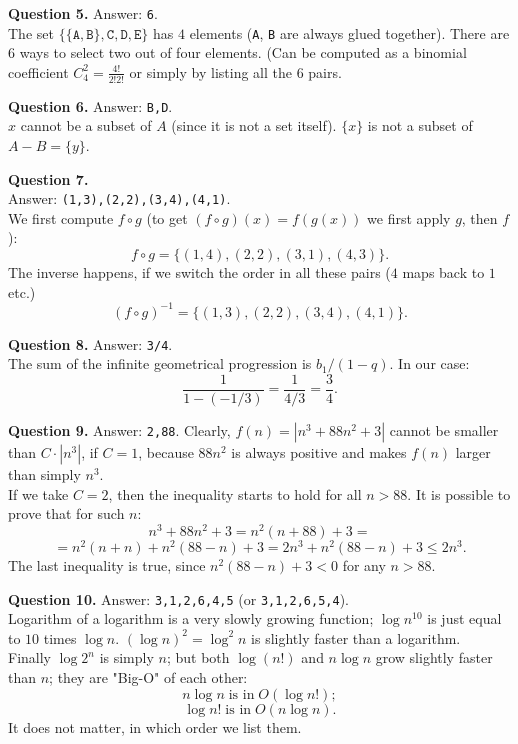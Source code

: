 \documentclass[jou]{apa6}
\begin{document}
\vspace{6pt}
{\bf Question 5.} Answer: {\tt 6}.\\
The set $\{ \{ \mathtt{A}, \mathtt{B} \}, \mathtt{C}, \mathtt{D}, \mathtt{E} \}$
has $4$ elements ({\tt A}, {\tt B} are always glued together). 
There are $6$ ways to select two out of four elements. 
(Can be computed as a binomial coefficient $C_4^2 = \frac{4!}{2!2!}$ or simply 
by listing all the $6$ pairs. 


\vspace{6pt}
{\bf Question 6.} Answer: {\tt B,D}.\\
$x$ cannot be a subset of $A$ (since it is not a set itself). 
$\{ x \}$ is not a subset of $A - B = \{ y \}$.

\vspace{6pt}
{\bf Question 7.}\\ Answer: {\tt (1,3),(2,2),(3,4),(4,1)}.\\
We first compute $f \circ g$ (to get $(f \circ g)(x) = f(g(x))$
we first apply $g$, then $f$): 
$$f \circ g = \{(1,4),(2,2),(3,1),(4,3)\}.$$
The inverse happens, if we switch the order in all these pairs
($4$ maps back to $1$ etc.)\\
$$(f \circ g)^{-1} = \{(1,3),(2,2),(3,4),(4,1)\}.$$


\vspace{6pt}
{\bf Question 8.} Answer: {\tt 3/4}.\\
The sum of the infinite geometrical progression is $b_1/(1 - q)$. 
In our case:
$$\frac{1}{1 - (-1/3)} = \frac{1}{4/3} = \frac{3}{4}.$$

\vspace{6pt}
{\bf Question 9.} Answer: {\tt 2,88}. 
Clearly, $f(n) = |n^3 +88n^2 +3|$ cannot be smaller than $C\cdot{}|n^3|$, 
if $C=1$, because $88n^2$ is always positive and makes $f(n)$ larger
than simply $n^3$.\\
If we take $C = 2$, then the inequality starts to hold for all $n>88$. 
It is possible to prove that for such $n$: 
$$n^3 +88n^2 +3 = n^2(n + 88) + 3 =$$
$$ = n^2(n+n) + n^2(88 -n) + 3  = 2n^3 + n^2(88-n) + 3 \leq 2n^3.$$
The last inequality is true, since $n^2(88-n) + 3 < 0$ for any 
$n > 88$.


\vspace{6pt}
{\bf Question 10.} Answer: {\tt 3,1,2,6,4,5} (or {\tt 3,1,2,6,5,4}).\\
Logarithm of a logarithm is a very slowly growing function; 
$\log n^{10}$ is just equal to $10$ times $\log n$. 
$(\log n)^2 = \log^2 n$ is slightly faster than a logarithm.\\
Finally $\log 2^n$ is simply $n$; but both $\log (n!)$ and
$n \log n$ grow slightly faster than $n$; they are "Big-O" of each other:
$$n \log n \;\text{is in}\;O(\log n!);$$
$$\log n! \;\text{is in}\;O(n \log n).$$
It does not matter, in which order we list them. 
\end{document}
